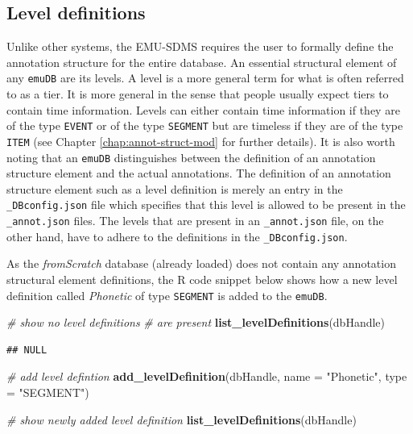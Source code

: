 \documentclass[]{book}
\newenvironment{Shaded}{\begin{snugshade}}{\end{snugshade}}
\newcommand{\CommentTok}[1]{\textcolor[rgb]{0.56,0.35,0.01}{\textit{#1}}}
\newcommand{\DataTypeTok}[1]{\textcolor[rgb]{0.13,0.29,0.53}{#1}}
\newcommand{\KeywordTok}[1]{\textcolor[rgb]{0.13,0.29,0.53}{\textbf{#1}}}
\newcommand{\NormalTok}[1]{#1}
\newcommand{\StringTok}[1]{\textcolor[rgb]{0.31,0.60,0.02}{#1}}
\begin{document}
\hypertarget{level-definitions}{%
\subsection{Level definitions}\label{level-definitions}}

Unlike other systems, the EMU-SDMS requires the user to formally define the annotation structure for the entire database. An essential structural element of any \texttt{emuDB} are its levels. A level is a more general term for what is often referred to as a tier. It is more general in the sense that people usually expect tiers to contain time information. Levels can either contain time information if they are of the type \texttt{EVENT} or of the type \texttt{SEGMENT} but are timeless if they are of the type \texttt{ITEM} (see Chapter \ref{chap:annot-struct-mod} for further details). It is also worth noting that an \texttt{emuDB} distinguishes between the definition of an annotation structure element and the actual annotations. The definition of an annotation structure element such as a level definition is merely an entry in the \texttt{\_DBconfig.json} file which specifies that this level is allowed to be present in the \texttt{\_annot.json} files. The levels that are present in an \texttt{\_annot.json} file, on the other hand, have to adhere to the definitions in the \texttt{\_DBconfig.json}.

As the \emph{fromScratch} database (already loaded) does not contain any annotation structural element definitions, the R code snippet below shows how a new level definition called \emph{Phonetic} of type \texttt{SEGMENT} is added to the \texttt{emuDB}.

\begin{Shaded}
\begin{Highlighting}[]
\CommentTok{# show no level definitions}
\CommentTok{# are present}
\KeywordTok{list_levelDefinitions}\NormalTok{(dbHandle)}
\end{Highlighting}
\end{Shaded}

\begin{verbatim}
## NULL
\end{verbatim}

\begin{Shaded}
\begin{Highlighting}[]
\CommentTok{# add level defintion}
\KeywordTok{add_levelDefinition}\NormalTok{(dbHandle,}
                    \DataTypeTok{name =} \StringTok{"Phonetic"}\NormalTok{,}
                    \DataTypeTok{type =} \StringTok{"SEGMENT"}\NormalTok{)}

\CommentTok{# show newly added level definition}
\KeywordTok{list_levelDefinitions}\NormalTok{(dbHandle)}
\end{Highlighting}
\end{Shaded}
\end{document}
